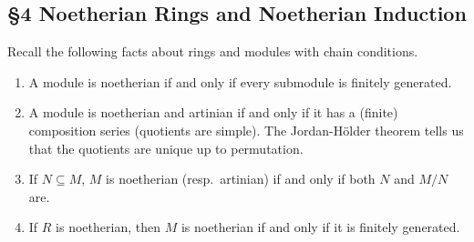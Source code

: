  \subsection{\S 4 Noetherian Rings and Noetherian Induction}
 Recall the following facts about rings and modules with chain conditions.
 \begin{enumerate}
   \item A module is noetherian if and only if every submodule is finitely generated.
   \item A module is noetherian and artinian if and only if it has a (finite) composition
   series (quotients are simple). The Jordan-H\"older theorem tells us that the quotients
   are unique up to permutation.
   \item If $N\subseteq M$, $M$ is noetherian (resp.\ artinian) if and only if both
   $N$ and $M/N$ are.
   \item If $R$ is noetherian, then $M$ is noetherian if and only if it is finitely
   generated.
 \end{enumerate}

